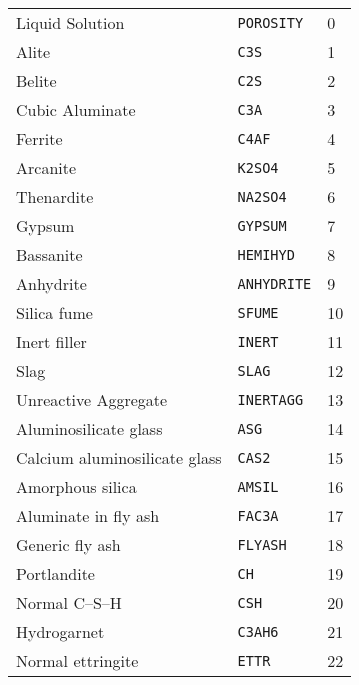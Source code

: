 \documentclass[12pt]{article}
\begin{document}
\begin{center} %
\tablelasttail{\hline}
\begin{supertabular}{lll}
    Liquid Solution & \texttt{POROSITY} & 0 \\
    Alite & \texttt{C3S} & 1 \\
    Belite & \texttt{C2S} & 2 \\
    Cubic Aluminate & \texttt{C3A} & 3 \\
    Ferrite & \texttt{C4AF} & 4 \\
    Arcanite & \texttt{K2SO4} & 5 \\
    Thenardite & \texttt{NA2SO4} & 6 \\
    Gypsum & \texttt{GYPSUM} & 7 \\
    Bassanite & \texttt{HEMIHYD} & 8 \\
    Anhydrite & \texttt{ANHYDRITE} & 9 \\
    Silica fume & \texttt{SFUME} & 10 \\
    Inert filler & \texttt{INERT} & 11 \\
    Slag & \texttt{SLAG} & 12 \\
    Unreactive Aggregate & \texttt{INERTAGG} & 13 \\
    Aluminosilicate glass & \texttt{ASG} & 14 \\
    Calcium aluminosilicate glass & \texttt{CAS2} & 15 \\
    Amorphous silica & \texttt{AMSIL} & 16 \\
    Aluminate in fly ash & \texttt{FAC3A} & 17 \\
    Generic fly ash & \texttt{FLYASH} & 18 \\
    Portlandite & \texttt{CH} & 19 \\
    Normal C--S--H & \texttt{CSH} & 20 \\
    Hydrogarnet & \texttt{C3AH6} & 21 \\
    Normal ettringite & \texttt{ETTR} & 22 \\

\end{supertabular}
\end{center}
\end{document}
